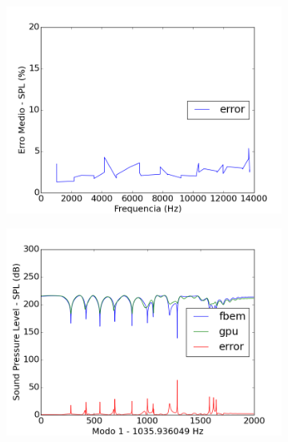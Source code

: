\begin{figure}[ht]
\centering
\begin{subfigure}{0.6\textwidth}
	\centering
	\includegraphics[width=\textwidth]{../data/transfer_test/ceramic_plate/plots/ceramic_plate_error.png}
	\caption{}
	\label{fig:coef_plate_err}
\end{subfigure}
\begin{subfigure}{0.45\textwidth}
	\centering
	\includegraphics[width=\textwidth]{../data/transfer_test/ceramic_plate/plots/ceramic_plate-tfv-0_1.png}
	\caption{}
	\label{fig:coef_plate_1}
\end{subfigure}%
\begin{subfigure}{0.45\textwidth}
	\centering

\end{subfigure}
\end{figure}

